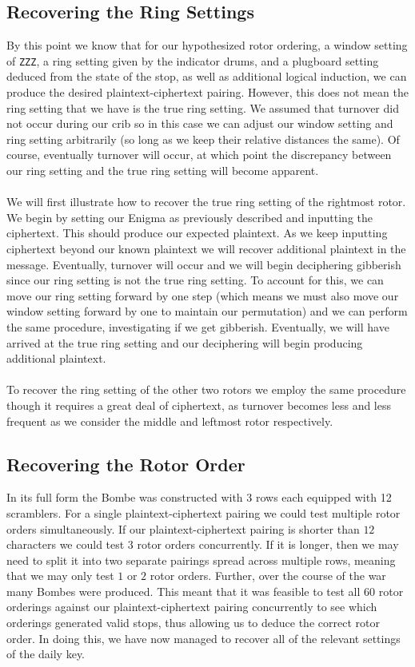 \subsection{Recovering the Ring Settings}\label{bombe_ring_setting}
By this point we know that for our hypothesized rotor ordering, a
window setting of \texttt{ZZZ}, a ring setting given by the indicator
drums, and a plugboard setting deduced from the state of the stop, as
well as additional logical induction, we can produce the desired plaintext-ciphertext pairing. However, this does not mean the ring
setting that we have is the true ring setting. We assumed that
turnover did not occur during our crib so in this case we can adjust
our window setting and ring setting arbitrarily (so long as we keep
their relative distances the same). Of course, eventually turnover
will occur, at which point the discrepancy between our ring setting
and the true ring setting will become apparent.
\\\\We will first illustrate how to recover the true ring setting of
the rightmost rotor. We begin by setting our Enigma as previously
described and inputting the ciphertext. This should produce our
expected plaintext. As we keep inputting ciphertext beyond our known
plaintext we will recover additional plaintext in the message.
Eventually, turnover will occur and we will begin deciphering
gibberish since our ring setting is not the true ring setting. To
account for this, we can move our ring setting forward by one step
(which means we must also move our window setting forward by one to
maintain our permutation) and we can perform the same procedure,
investigating if we get gibberish. Eventually, we will have arrived
at the true ring setting and our deciphering will begin producing
additional plaintext.
\\\\To recover the ring setting of the other two rotors we employ the
same procedure though it requires a great deal of ciphertext, as
turnover becomes less and less frequent as we consider the middle and
leftmost rotor respectively.

\subsection{Recovering the Rotor Order}
In its full form the Bombe was constructed with $3$ rows each
equipped with 12 scramblers. For a single plaintext-ciphertext
pairing we could test multiple rotor orders simultaneously. If our
plaintext-ciphertext pairing is shorter than $12$ characters we could
test $3$ rotor orders concurrently. If it is longer, then we may need
to split it into two separate pairings spread across multiple rows,
meaning that we may only test $1$ or $2$ rotor orders. Further, over
the course of the war many Bombes were produced. This meant that it
was feasible to test all $60$ rotor orderings against our
plaintext-ciphertext pairing concurrently to see which orderings generated valid
stops, thus allowing us to deduce the correct rotor order. In doing
this, we have now managed to recover all of the relevant settings of
the daily key.

